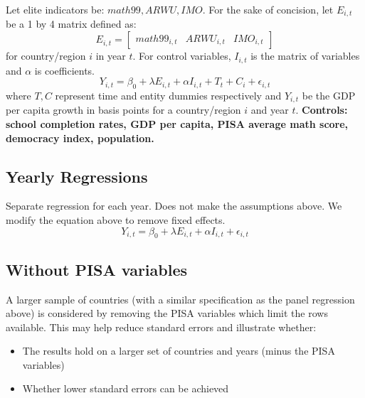 \documentclass[11pt]{article}
\begin{document}
Let elite indicators be: $math99, ARWU, IMO$.
For the sake of concision, let $E_{i,t}$ be a 1 by 4 matrix defined as:
\[E_{i,t} = 
\begin{bmatrix}
    math99_{i, t} & ARWU_{i, t} & IMO_{i, t}
\end{bmatrix}
\] for country/region $i$ in year $t$.
For control variables, $I_{i, t}$ is the matrix of variables and $\alpha$ is coefficients.
\begin{equation}
    Y_{i, t} = \beta_0 + \lambda E_{i, t} + \alpha I_{i, t} + T_t + C_i + \epsilon_{i, t}
\end{equation}
where $T,C$ represent time and entity dummies respectively and $Y_{i,t}$ be the GDP per capita growth in basis points for a country/region $i$ and year $t$.
\textbf{Controls: school completion rates, GDP per capita, PISA average math score, democracy index, population.}

\subsection{Yearly Regressions}
Separate regression for each year. Does not make the assumptions above. We modify the equation above to remove fixed effects.
\begin{equation}
    Y_{i, t} = \beta_0 + \lambda E_{i, t} + \alpha I_{i, t} + \epsilon_{i, t}
\end{equation}

\subsection{Without PISA variables}
A larger sample of countries (with a similar specification as the panel regression above) is considered by removing the PISA variables which limit the rows available.
This may help reduce standard errors and illustrate whether:
\begin{itemize}
    \item The results hold on a larger set of countries and years (minus the PISA variables)
    \item Whether lower standard errors can be achieved
\end{itemize}
\end{document}
